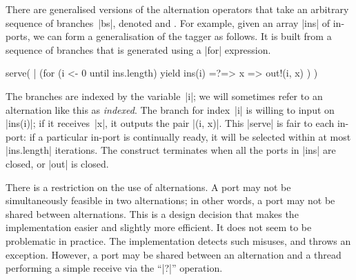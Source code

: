 
There are generalised versions of the alternation operators that take an
arbitrary sequence of branches~|bs|, denoted  and
.  For example, given an array |ins| of in-ports, we can
form a generalisation of the tagger as follows.  It is built from a sequence
of branches that is generated using a |for| expression.
% 
\begin{scala}
  serve( | (for (i <- 0 until ins.length) yield ins(i) =?=> { x => out!(i, x) }) )
\end{scala}
%
The branches are indexed by the variable~|i|; we will sometimes refer to an
alternation like this as \emph{indexed}.  The branch for index~|i| is willing
to input on |ins(i)|; if it receives~|x|, it outputs the pair |(i, x)|.  This
|serve| is fair to each in-port: if a particular in-port is continually ready,
it will be selected within at most |ins.length| iterations.  The construct
terminates when all the ports in |ins| are closed, or |out| is closed.

There is a restriction on the use of alternations.  A port may not be
simultaneously feasible in two alternations; in other words, a port may not be
shared between alternations.  This is a design decision that makes the
implementation easier and slightly more efficient.  It does not seem to be
problematic in practice.  The implementation detects such misuses, and throws
an exception.  However, a port may be shared between an alternation and a
thread performing a simple receive via the ``|?|'' operation.
